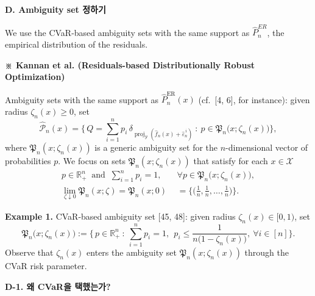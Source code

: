 \documentclass[10pt,a4paper]{article}
\newcommand{\hd}[1]{\par\vspace{8pt}\textbf{#1}\par\vspace{3pt}}
\begin{document}
\hd{D. Ambiguity set 정하기}
We use the CVaR-based ambiguity sets with the same support as $\hat P^{ER}_n$, the empirical distribution of the residuals.

\begin{framed}
\textbf{※ Kannan et al. (Residuals-based Distributionally Robust Optimization)}

Ambiguity sets with the same support as $\hat{P}^{\mathrm{ER}}_n(x)$ (cf.\ [4, 6], for instance):
given radius $\zeta_n(x)\ge 0$, set
\[
\hat{\mathcal{P}}_n(x)=\Big\{\,Q=\sum_{i=1}^{n}p_i\,\delta_{\operatorname{proj}_{\mathcal{Y}}(\hat f_n(x)+\hat\varepsilon^{\,i}_n)}
\ :\ p\in\mathfrak{P}_n\big(x;\zeta_n(x)\big)\Big\},
\]
where $\mathfrak{P}_n(x;\zeta_n(x))$ is a generic ambiguity set for the $n$-dimensional vector of
probabilities $p$. We focus on sets $\mathfrak{P}_n(x;\zeta_n(x))$ that satisfy for each $x\in\mathcal{X}$
\begin{equation}
\begin{aligned}
p\in\mathbb{R}^{n}_{+}\ \text{ and }\ \sum_{i=1}^{n}p_i=1,\quad &\forall p\in\mathfrak{P}_n\big(x;\zeta_n(x)\big),\\[2pt]
\lim_{\zeta\downarrow 0}\mathfrak{P}_n(x;\zeta)=\mathfrak{P}_n(x;0)
&=\Big\{\Big(\tfrac{1}{n},\tfrac{1}{n},\dots,\tfrac{1}{n}\Big)\Big\}.
\end{aligned}
\tag{8}
\end{equation}

\textbf{Example 1.} CVaR-based ambiguity set [45, 48]: given radius $\zeta_n(x)\in[0,1)$, set
\[
\mathfrak{P}_n\big(x;\zeta_n(x)\big):=\Big\{\,p\in\mathbb{R}^{n}_{+}\ :\ \sum_{i=1}^{n}p_i=1,\ \
p_i\le\frac{1}{n\big(1-\zeta_n(x)\big)},\ \forall i\in[n]\Big\}.
\]
Observe that $\zeta_n(x)$ enters the ambiguity set $\mathfrak{P}_n(x;\zeta_n(x))$ through the CVaR risk parameter.
\end{framed}
\hd{D-1. 왜 CVaR을 택했는가?}
\end{document}
